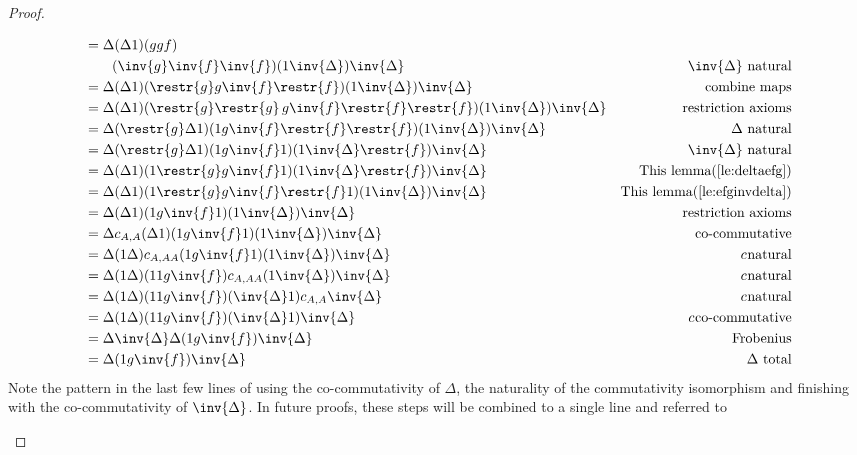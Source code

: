 \begin{proof}
\begin{enumerate}[{(}i{)}]
\begin{align*}
        &=\Delta (\Delta\*1)(g \* g \* f)\\
          &\qquad(\inv{g} \* \inv{f}\* \inv{f})(1\* \inv{\Delta})\inv{\Delta}&\inv{\Delta} \text{ natural}\\
        &=\Delta (\Delta\*1)(\restr{g} \* g \inv{f}\* \restr{f})(1\* \inv{\Delta})\inv{\Delta}&\text{combine maps}\\
        &=\Delta (\Delta\*1)(\restr{g} \* \restr{g}\,g \inv{f}\restr{f}\* \restr{f})(1\* \inv{\Delta})\inv{\Delta}&\text{restriction axioms}\\
        &=\Delta (\restr{g}\Delta\*1)(1\*g\inv{f}\restr{f}\* \restr{f})(1\*\inv{\Delta}) \inv{\Delta}&\Delta \text{ natural}\\
        &=\Delta (\restr{g}\Delta\*1)(1\*g\inv{f}\*1)(1\*\inv{\Delta}\restr{f}) \inv{\Delta}&\inv{\Delta} \text{ natural}\\
        &=\Delta (\Delta\*1)(1 \* \restr{g}g \inv{f}\*1)(1\*\inv{\Delta}\restr{f}) \inv{\Delta}&\text{This lemma(\ref{le:deltaefg})}\\
        &=\Delta (\Delta\*1)(1 \* \restr{g}g \inv{f}\restr{f}\*1)(1\*\inv{\Delta}) \inv{\Delta}&\text{This lemma(\ref{le:efginvdelta})}\\
        &=\Delta (\Delta\*1)(1 \*g \inv{f}\*1)(1\*\inv{\Delta}) \inv{\Delta}&\text{restriction axioms}\\
        &=\Delta c_{A,A}(\Delta\*1)(1 \*g \inv{f}\*1)(1\*\inv{\Delta}) \inv{\Delta}&\text{co-commutative}\\
        &=\Delta (1\*\Delta)c_{A,A\*A}(1 \*g \inv{f}\*1)(1\*\inv{\Delta}) \inv{\Delta}&c_{\*}\text{natural}\\
        &=\Delta (1\*\Delta)(1\*1\*g \inv{f})c_{A,A\*A}(1\*\inv{\Delta}) \inv{\Delta}&c_{\*}\text{natural}\\
        &=\Delta (1\*\Delta)(1\*1\*g \inv{f})(\inv{\Delta}\*1)c_{A,A} \inv{\Delta}&c_{\*}\text{natural}\\
        &=\Delta (1\*\Delta)(1\*1\*g \inv{f})(\inv{\Delta}\*1) \inv{\Delta}&c_{\*}\text{co-commutative}\\
        &=\Delta \inv{\Delta}\Delta (1 \* g \inv{f})\inv{\Delta}&\text{Frobenius}\\
        &=\Delta(1 \* g \inv{f}) \inv{\Delta}&\Delta\text{ total}
      \end{align*}
      Note the pattern in the last few lines of using the co-commutativity of $\Delta$, the
      naturality of the commutativity isomorphism and finishing with the co-commutativity of
      $\inv{\Delta}$. In future proofs, these steps will be combined to a single line and referred to

\end{enumerate}
\end{proof}

